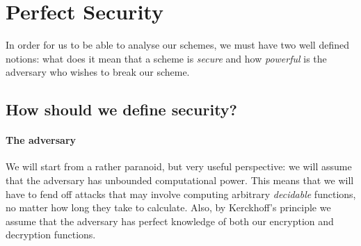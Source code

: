 \documentclass{article}
\theoremstyle{definition}
\theoremstyle{example}
\begin{document}
\section{Perfect Security}
In order for us to be able to analyse our schemes, we must have two well defined
notions: what does it mean that a scheme is \textit{secure} and how \textit{powerful} is
the adversary who wishes to break our scheme.
\subsection{How should we define security?}
\paragraph{The adversary} We will start from a rather
paranoid, but very useful perspective: we will assume that the adversary has
unbounded computational power. This means that we will have to fend off attacks
that may involve computing arbitrary \textit{decidable} functions, no matter how
long they take to calculate. Also, by Kerckhoff's principle we assume that the
adversary has perfect knowledge of both our encryption and decryption functions.
\end{document}
